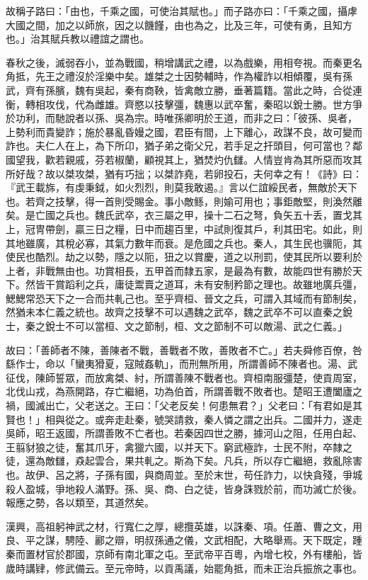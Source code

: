 \begin{pinyinscope}
故稱子路曰：「由也，千乘之國，可使治其賦也。」而子路亦曰：「千乘之國，攝虖大國之間，加之以師旅，因之以饑饉，由也為之，比及三年，可使有勇，且知方也。」治其賦兵教以禮誼之謂也。

春秋之後，滅弱吞小，並為戰國，稍增講武之禮，以為戲樂，用相夸視。而秦更名角抵，先王之禮沒於淫樂中矣。雄桀之士因勢輔時，作為權詐以相傾覆，吳有孫武，齊有孫臏，魏有吳起，秦有商鞅，皆禽敵立勝，垂著篇籍。當此之時，合從連衡，轉相攻伐，代為雌雄。齊愍以技擊彊，魏惠以武卒奮，秦昭以銳士勝。世方爭於功利，而馳說者以孫、吳為宗。時唯孫卿明於王道，而非之曰：「彼孫、吳者，上勢利而貴變詐；施於暴亂昏嫚之國，君臣有間，上下離心，政謀不良，故可變而詐也。夫仁人在上，為下所卬，猶子弟之衛父兄，若手足之扞頭目，何可當也？鄰國望我，歡若親戚，芬若椒蘭，顧視其上，猶焚灼仇讎。人情豈肯為其所惡而攻其所好哉？故以桀攻桀，猶有巧拙；以桀詐堯，若卵投石，夫何幸之有！《詩》曰：『武王載旆，有虔秉鉞，如火烈烈，則莫我敢遏。』言以仁誼綏民者，無敵於天下也。若齊之技擊，得一首則受賜金。事小敵鲧，則媮可用也；事鉅敵堅，則渙然離矣。是亡國之兵也。魏氏武卒，衣三屬之甲，操十二石之弩，負矢五十丢，置戈其上，冠冑帶劍，贏三日之糧，日中而趨百里，中試則復其戶，利其田宅。如此，則其地雖廣，其稅必寡，其氣力數年而衰。是危國之兵也。秦人，其生民也骥阨，其使民也酷烈。劫之以勢，隱之以阨，狃之以賞慶，道之以刑罰，使其民所以要利於上者，非戰無由也。功賞相長，五甲首而隸五家，是最為有數，故能四世有勝於天下。然皆干賞蹈利之兵，庸徒鬻賣之道耳，未有安制矜節之理也。故雖地廣兵彊，鰓鰓常恐天下之一合而共軋己也。至乎齊桓、晉文之兵，可謂入其域而有節制矣，然猶未本仁義之統也。故齊之技擊不可以遇魏之武卒，魏之武卒不可以直秦之銳士，秦之銳士不可以當桓、文之節制，桓、文之節制不可以敵湯、武之仁義。」

故曰：「善師者不陳，善陳者不戰，善戰者不敗，善敗者不亡。」若夫舜修百僚，咎繇作士，命以「蠻夷猾夏，寇賊姦軌」，而刑無所用，所謂善師不陳者也。湯、武征伐，陳師誓眾，而放禽桀、紂，所謂善陳不戰者也。齊桓南服彊楚，使貢周室，北伐山戎，為燕開路，存亡繼絕，功為伯首，所謂善戰不敗者也。楚昭王遭闔廬之禍，國滅出亡，父老送之。王曰：「父老反矣！何患無君？」父老曰：「有君如是其賢也！」相與從之。或奔走赴秦，號哭請救，秦人憐之謂之出兵。二國并力，遂走吳師，昭王返國，所謂善敗不亡者也。若秦因四世之勝，據河山之阻，任用白起、王翦豺狼之徒，奮其爪牙，禽獵六國，以并天下。窮武極詐，士民不附，卒隸之徒，還為敵讎，猋起雲合，果共軋之。斯為下矣。凡兵，所以存亡繼絕，救亂除害也。故伊、呂之將，子孫有國，與商周並。至於末世，苟任詐力，以快貪殘，爭城殺人盈城，爭地殺人滿野。孫、吳、商、白之徒，皆身誅戮於前，而功滅亡於後。報應之勢，各以類至，其道然矣。

漢興，高祖躬神武之材，行寬仁之厚，總攬英雄，以誅秦、項。任蕭、曹之文，用良、平之謀，騁陸、酈之辯，明叔孫通之儀，文武相配，大略舉焉。天下既定，踵秦而置材官於郡國，京師有南北軍之屯。至武帝平百粵，內增七校，外有樓船，皆歲時講肄，修武備云。至元帝時，以貢禹議，始罷角抵，而未正治兵振旅之事也。


\end{pinyinscope}
